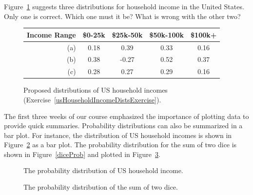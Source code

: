 \documentclass{ccg-topic}
\begin{document}
\begin{todo}\label{usHouseholdIncomeDistsExercise}
Figure~\ref{usHouseholdIncomeDists} suggests three distributions for household income in the United States. Only one is correct. Which one must it be? What is wrong with the other two?\footnotemark
\end{todo}

\begin{figure}[h]
\centering
\begin{tabular}{r | cc cc}
  \hline
Income Range & \$0-25k & \$25k-50k & \$50k-100k & \$100k+ \\
  \hline
(a)\hspace{0.2mm}	 & 0.18 & 0.39 & 0.33 & 0.16 \\
(b)				 & 0.38 & -0.27 & 0.52 & 0.37 \\
(c)\hspace{0.2mm}	 & 0.28 & 0.27 & 0.29 & 0.16 \\
  \hline
\end{tabular}
\caption{Proposed distributions of US household incomes (Exercise~\ref{usHouseholdIncomeDistsExercise}).}
\label{usHouseholdIncomeDists}
\end{figure}

The first three weeks of our course emphasized the importance of plotting data to provide quick summaries. Probability distributions can also be summarized in a bar plot. For instance, the distribution of US household incomes is shown in Figure~\ref{usHouseholdIncomeDistBar} as a bar plot. %
The probability distribution for the sum of two dice is shown in Figure~\ref{diceProb} and plotted in Figure~\ref{diceSumDist}.

\begin{figure}[h]
  \centering
  \caption{The probability distribution of US household income.}
  \label{usHouseholdIncomeDistBar}
\end{figure}

\begin{figure}
  \centering
  \caption{The probability distribution of the sum of two dice.}
  \label{diceSumDist}
\end{figure}
\end{document}
